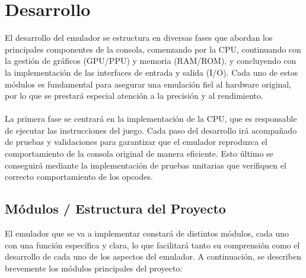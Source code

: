 \chapter{Desarrollo}
\label{develop}

El desarrollo del emulador se estructura en diversas fases que abordan los principales componentes de la consola, comenzando por la CPU, continuando con la gestión de gráficos (GPU/PPU) y memoria (RAM/ROM), y concluyendo con la implementación de las interfaces de entrada y salida (I/O). Cada uno de estos módulos es fundamental para asegurar una emulación fiel al hardware original, por lo que se prestará especial atención a la precisión y al rendimiento.
\\\\
La primera fase se centrará en la implementación de la CPU, que es responsable de ejecutar las instrucciones del juego. Cada paso del desarrollo irá acompañado de pruebas y validaciones para garantizar que el emulador reproduzca el comportamiento de la consola original de manera eficiente. Esto último se conseguirá mediante la implementación de pruebas unitarias que verifiquen el correcto comportamiento de los opcodes.

\section{Módulos / Estructura del Proyecto}

El emulador que se va a implementar constará de distintos módulos, cada uno con una función específica y clara, lo que facilitará tanto su comprensión como el desarrollo de cada uno de los aspectos del emulador. A continuación, se describen brevemente los módulos principales del proyecto:

